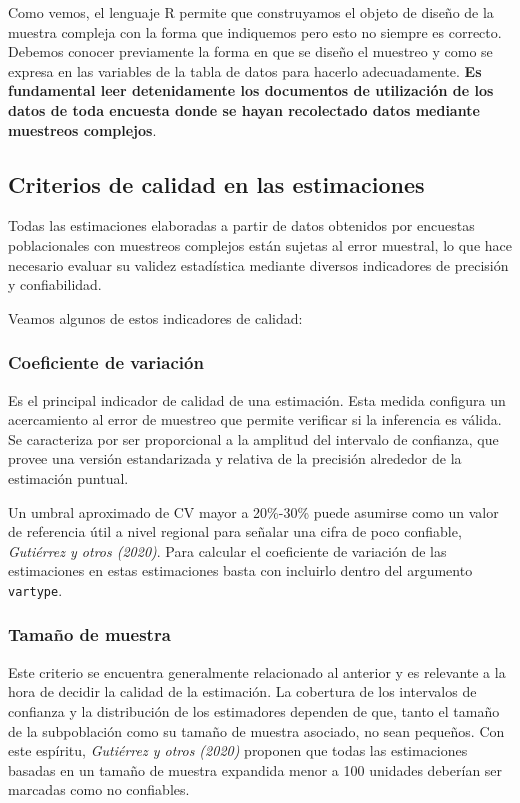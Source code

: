 \documentclass[
  spanish,
  a4paper,
]{scrbook}
\begin{document}
Como vemos, el lenguaje R permite que construyamos el objeto de diseño
de la muestra compleja con la forma que indiquemos pero esto no siempre
es correcto. Debemos conocer previamente la forma en que se diseño el
muestreo y como se expresa en las variables de la tabla de datos para
hacerlo adecuadamente. \textbf{Es fundamental leer detenidamente los
documentos de utilización de los datos de toda encuesta donde se hayan
recolectado datos mediante muestreos complejos}.

\subsection{Criterios de calidad en las
estimaciones}\label{criterios-de-calidad-en-las-estimaciones}

Todas las estimaciones elaboradas a partir de datos obtenidos por
encuestas poblacionales con muestreos complejos están sujetas al error
muestral, lo que hace necesario evaluar su validez estadística mediante
diversos indicadores de precisión y confiabilidad.

Veamos algunos de estos indicadores de calidad:

\subsubsection{Coeficiente de
variación}\label{coeficiente-de-variaciuxf3n}

Es el principal indicador de calidad de una estimación. Esta medida
configura un acercamiento al error de muestreo que permite verificar si
la inferencia es válida. Se caracteriza por ser proporcional a la
amplitud del intervalo de confianza, que provee una versión
estandarizada y relativa de la precisión alrededor de la estimación
puntual.

Un umbral aproximado de CV mayor a 20\%-30\% puede asumirse como un
valor de referencia útil a nivel regional para señalar una cifra de poco
confiable, \emph{Gutiérrez y otros (2020)}. Para calcular el coeficiente
de variación de las estimaciones en estas estimaciones basta con
incluirlo dentro del argumento \texttt{vartype}.

\subsubsection{Tamaño de muestra}\label{tamauxf1o-de-muestra}

Este criterio se encuentra generalmente relacionado al anterior y es
relevante a la hora de decidir la calidad de la estimación. La cobertura
de los intervalos de confianza y la distribución de los estimadores
dependen de que, tanto el tamaño de la subpoblación como su tamaño de
muestra asociado, no sean pequeños. Con este espíritu, \emph{Gutiérrez y
otros (2020)} proponen que todas las estimaciones basadas en un tamaño
de muestra expandida menor a 100 unidades deberían ser marcadas como no
confiables.
\end{document}
